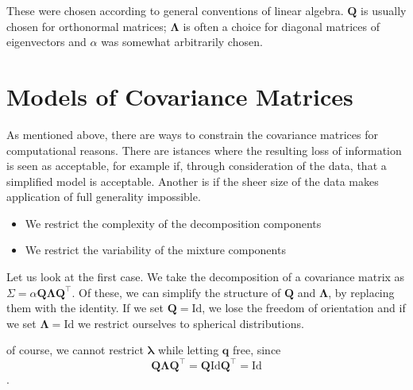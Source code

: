 These were chosen according to general conventions of linear algebra. $ \pmb{Q} $
is usually chosen for orthonormal matrices; $ \pmb{\Lambda} $ is often a choice 
for diagonal matrices of eigenvectors and $ \alpha $ was somewhat arbitrarily 
chosen.


\section{Models of Covariance Matrices}
\label{sec:models}


As mentioned above, there are ways to constrain the covariance matrices for 
computational reasons. There are istances where the resulting loss of 
information is seen as acceptable, for example if, through consideration of the
data, that a simplified model is acceptable. Another is if the sheer size of 
the data makes application of full generality impossible.
\begin{itemize}
    \item We restrict the complexity of the decomposition components
    \item We restrict the variability of the mixture components
\end{itemize}
Let us look at the first case. We take the decomposition of a covariance matrix
as $\Sigma = \alpha \pmb{Q\Lambda Q}^\top$. Of these, we can simplify the 
structure of $\pmb{Q}$ and $\pmb{\Lambda}$, by replacing them with the identity.
If we set $\pmb{Q}=\mathrm{Id}$, we lose the freedom of orientation and if we 
set $\pmb{\Lambda}=\mathrm{Id}$ we restrict ourselves to spherical 
distributions.

of course, we cannot restrict $\pmb{\lambda}$ while letting $\pmb{q}$ free, 
since
\[ \pmb{Q\Lambda Q}^\top = \pmb{Q}\mathrm{Id}\pmb{Q}^\top = \mathrm{Id}\].

